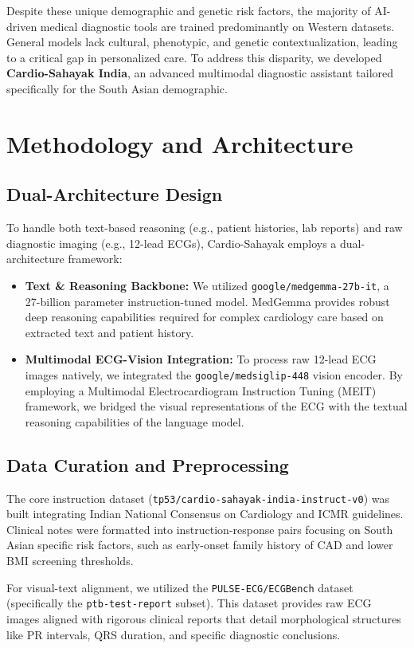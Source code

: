 \documentclass[11pt,a4paper]{article}
\begin{document}
Despite these unique demographic and genetic risk factors, the majority of AI-driven medical diagnostic tools are trained predominantly on Western datasets. General models lack cultural, phenotypic, and genetic contextualization, leading to a critical gap in personalized care. To address this disparity, we developed \textbf{Cardio-Sahayak India}, an advanced multimodal diagnostic assistant tailored specifically for the South Asian demographic.

\section{Methodology and Architecture}

\subsection{Dual-Architecture Design}
To handle both text-based reasoning (e.g., patient histories, lab reports) and raw diagnostic imaging (e.g., 12-lead ECGs), Cardio-Sahayak employs a dual-architecture framework:
\begin{itemize}
    \item \textbf{Text \& Reasoning Backbone:} We utilized \texttt{google/medgemma-27b-it}, a 27-billion parameter instruction-tuned model. MedGemma provides robust deep reasoning capabilities required for complex cardiology care based on extracted text and patient history.
    \item \textbf{Multimodal ECG-Vision Integration:} To process raw 12-lead ECG images natively, we integrated the \texttt{google/medsiglip-448} vision encoder. By employing a Multimodal Electrocardiogram Instruction Tuning (MEIT) framework, we bridged the visual representations of the ECG with the textual reasoning capabilities of the language model.
\end{itemize}

\subsection{Data Curation and Preprocessing}
The core instruction dataset (\texttt{tp53/cardio-sahayak-india-instruct-v0}) was built integrating Indian National Consensus on Cardiology and ICMR guidelines. Clinical notes were formatted into instruction-response pairs focusing on South Asian specific risk factors, such as early-onset family history of CAD and lower BMI screening thresholds.

For visual-text alignment, we utilized the \texttt{PULSE-ECG/ECGBench} dataset (specifically the \texttt{ptb-test-report} subset). This dataset provides raw ECG images aligned with rigorous clinical reports that detail morphological structures like PR intervals, QRS duration, and specific diagnostic conclusions.
\end{document}
